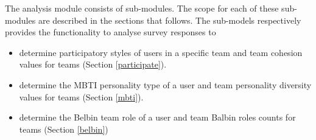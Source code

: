 The analysis module consists of sub-modules. The scope for each of these sub-modules are described in the sections that follows.  The sub-models respectively provides the functionality to analyse survey responses to
\begin{itemize}
\item determine participatory styles of users in a specific team and team cohesion values for teams (Section \ref{participate}).
\item determine the MBTI personality type of a user and team personality diversity values for teams (Section \ref{mbti}).
\item determine the Belbin team role of a user and team Balbin roles counts for teams (Section \ref{belbin})
\end{itemize} 

